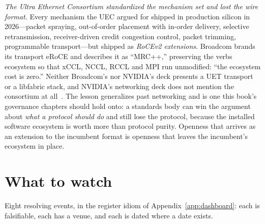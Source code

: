 \emph{The Ultra Ethernet Consortium standardized the mechanism set and lost the wire format.} Every mechanism the UEC argued for shipped in production silicon in 2026---packet spraying, out-of-order placement with in-order delivery, selective retransmission, receiver-driven credit congestion control, packet trimming, programmable transport---but shipped as \emph{RoCEv2 extensions}. Broadcom brands its transport eRoCE and describes it as ``MRC++,'' preserving the verbs ecosystem so that xCCL, NCCL, RCCL and MPI run unmodified: ``the ecosystem cost is zero.'' Neither Broadcom's nor NVIDIA's deck presents a UET transport or a libfabric stack, and NVIDIA's networking deck does not mention the consortium at all~\cite{hc2026-uec}. The lesson generalizes past networking and is one this book's governance chapters should hold onto: a standards body can win the argument about \emph{what a protocol should do} and still lose the protocol, because the installed software ecosystem is worth more than protocol purity. Openness that arrives as an extension to the incumbent format is openness that leaves the incumbent's ecosystem in place.

\section{What to watch}

Eight resolving events, in the register idiom of Appendix~\ref{app:dashboard}: each is falsifiable, each has a venue, and each is dated where a date exists.

